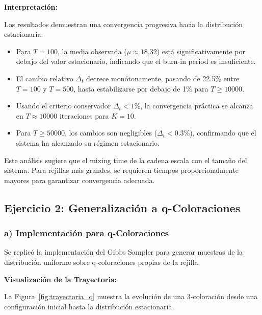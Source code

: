 \textbf{Interpretación:}

Los resultados demuestran una convergencia progresiva hacia la distribución estacionaria:

\begin{itemize}
    \item Para $T=100$, la media observada ($\mu \approx 18.32$) está significativamente por debajo del valor estacionario, indicando que el burn-in period es insuficiente.

    \item El cambio relativo $\Delta_t$ decrece monótonamente, pasando de 22.5\% entre $T=100$ y $T=500$, hasta estabilizarse por debajo de 1\% para $T \geq 10000$.

    \item Usando el criterio conservador $\Delta_t < 1\%$, la convergencia práctica se alcanza en $T \approx 10000$ iteraciones para $K=10$.

    \item Para $T \geq 50000$, los cambios son negligibles ($\Delta_t < 0.3\%$), confirmando que el sistema ha alcanzado su régimen estacionario.
\end{itemize}

Este análisis sugiere que el mixing time de la cadena escala con el tamaño del sistema. Para rejillas más grandes, se requieren tiempos proporcionalmente mayores para garantizar convergencia adecuada.

\vspace{1.5cm}

\subsection{Ejercicio 2: Generalización a q-Coloraciones}

\subsubsection{a) Implementación para q-Coloraciones}

Se replicó la implementación del Gibbs Sampler para generar muestras de la distribución uniforme sobre q-coloraciones propias de la rejilla.

\textbf{Visualización de la Trayectoria:}

La Figura~\ref{fig:trayectoria_q} muestra la evolución de una 3-coloración desde una configuración inicial hasta la distribución estacionaria.

